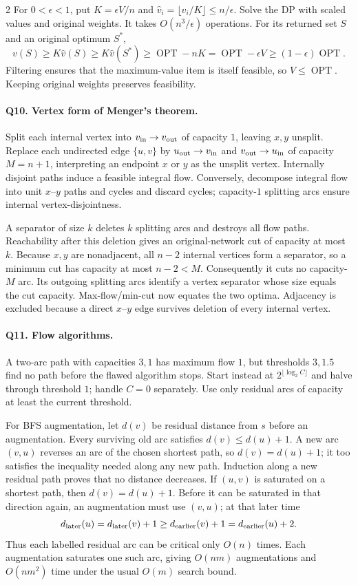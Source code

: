 \documentclass[10pt]{article}
\theoremstyle{definition}
\newcommand{\OPT}{\operatorname{OPT}}
\begin{document}
\begin{multicols*}{2}
For $0<\epsilon<1$, put $K=\epsilon V/n$ and
$\widehat v_i=\lfloor v_i/K\rfloor\le n/\epsilon$.  Solve the DP with
scaled values and original weights.  It takes $O(n^3/\epsilon)$ operations.
For its returned set $S$ and an original optimum $S^*$,
\[
v(S)\ge K\widehat v(S)\ge K\widehat v(S^*)
\ge\OPT-nK=\OPT-\epsilon V\ge(1-\epsilon)\OPT.
\]
Filtering ensures that the maximum-value item is itself feasible, so
$V\le\OPT$.  Keeping original weights preserves feasibility.

\paragraph{Q10. Vertex form of Menger's theorem.}
Split each internal vertex into $v_{\rm in}\to v_{\rm out}$ of capacity
$1$, leaving $x,y$ unsplit.  Replace each undirected edge $\{u,v\}$ by
$u_{\rm out}\to v_{\rm in}$ and $v_{\rm out}\to u_{\rm in}$ of capacity
$M=n+1$, interpreting an endpoint $x$ or $y$ as the unsplit vertex.
Internally disjoint paths induce a feasible integral flow.  Conversely,
decompose integral flow into unit $x$--$y$ paths and cycles and discard
cycles; capacity-$1$ splitting arcs ensure internal vertex-disjointness.

A separator of size $k$ deletes $k$ splitting arcs and destroys all flow
paths.  Reachability after this deletion gives an original-network cut
of capacity at most $k$.  Because $x,y$ are nonadjacent, all $n-2$ internal
vertices form a separator, so a minimum cut has capacity at most
$n-2<M$.  Consequently it cuts no capacity-$M$ arc.  Its outgoing splitting
arcs identify a vertex separator whose size equals the cut capacity.
Max-flow/min-cut now equates the two optima.  Adjacency is excluded because
a direct $x$--$y$ edge survives deletion of every internal vertex.

\paragraph{Q11. Flow algorithms.}
A two-arc path with capacities $3,1$ has maximum flow $1$, but thresholds
$3,1.5$ find no path before the flawed algorithm stops.  Start instead at
$2^{\lfloor\log_2 C\rfloor}$ and halve through threshold $1$; handle $C=0$
separately.  Use only residual arcs of capacity at least the current threshold.

For BFS augmentation, let $d(v)$ be residual distance from $s$ before an
augmentation.  Every surviving old arc satisfies $d(v)\le d(u)+1$.
A new arc $(v,u)$ reverses an arc of the chosen shortest path, so
$d(v)=d(u)+1$; it too satisfies the inequality needed along any new path.
Induction along a new residual path proves that no distance decreases.
If $(u,v)$ is saturated on a shortest path, then $d(v)=d(u)+1$.
Before it can be saturated in that direction again, an augmentation must
use $(v,u)$; at that later time
\[
d_{\rm later}(u)=d_{\rm later}(v)+1
\ge d_{\rm earlier}(v)+1=d_{\rm earlier}(u)+2.
\]
Thus each labelled residual arc can be critical only $O(n)$ times.
Each augmentation saturates one such arc, giving $O(nm)$ augmentations
and $O(nm^2)$ time under the usual $O(m)$ search bound.


\end{multicols*}
\end{document}
